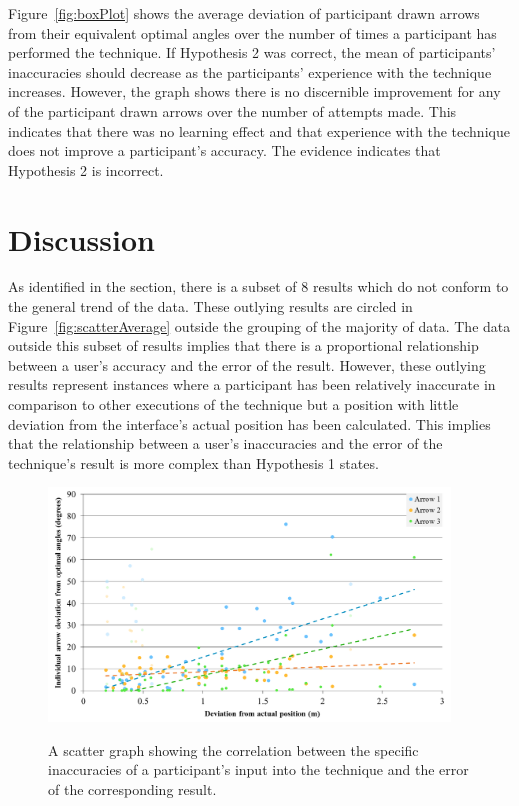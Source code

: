 \documentclass{bmcart}
\begin{document}
Figure~\ref{fig:boxPlot} shows the average deviation of participant drawn arrows from their equivalent optimal angles over the number of times a participant has performed the technique.
If Hypothesis 2 was correct, the mean of participants' inaccuracies should decrease as the participants' experience with the technique increases.
However, the graph shows there is no discernible improvement for any of the participant drawn arrows over the number of attempts made.
This indicates that there was no learning effect and that experience with the technique does not improve a participant's accuracy.
The evidence indicates that Hypothesis 2 is incorrect.


\section*{Discussion}\label{sec:discussion}

As identified in the  section, there is a subset of 8 results which do not conform to the general trend of the data.
These outlying results are circled in Figure~\ref{fig:scatterAverage} outside the grouping of the majority of data.
The data outside this subset of results implies that there is a proportional relationship between a user's accuracy and the error of the result.
However, these outlying results represent instances where a participant has been relatively inaccurate in comparison to other executions of the technique but a position with little deviation from the interface's actual position has been calculated.
This implies that the relationship between a user's inaccuracies and the error of the technique's result is more complex than Hypothesis 1 states.

\begin{figure}[h]
   \centering
   \caption{A scatter graph showing the correlation between the specific inaccuracies of a participant's input into the technique and the error of the corresponding result.}
   \includegraphics[width=0.95\textwidth]{figures/total_deviation_vs_angle_deviations.png}
   \label{fig:scatterIndividual}
\end{figure}
\end{document}
